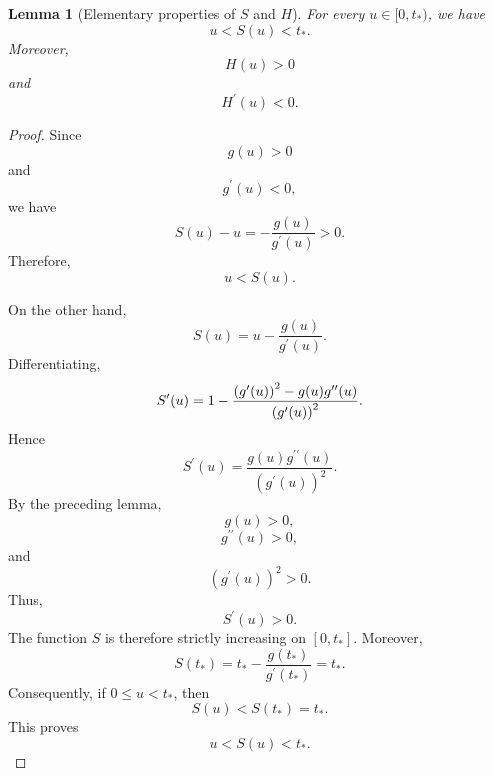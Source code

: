 \documentclass[11pt,a4paper]{article}
\numberwithin{equation}{section}
\numberwithin{table}{section}
\theoremstyle{plain}
\newtheorem{lemma}[theorem]{Lemma}
\theoremstyle{definition}\newtheorem{definition}[theorem]{Definition}
\theoremstyle{remark}\newtheorem{remark}[theorem]{Remark}
\begin{document}
\begin{lemma}[Elementary properties of $S$ and $H$]\label{supp:s2lemma2}
For every $u\in[0,t_*)$, we have 
\begin{equation*}
u<S(u)<t_*.
\end{equation*}
Moreover, 
\begin{equation*}
H(u)>0
\end{equation*}
and 
\begin{equation*}
H^{\prime}(u)<0.
\end{equation*}
\end{lemma}

\begin{proof}
Since 
\begin{equation*}
g(u)>0
\end{equation*}
and 
\begin{equation*}
g^{\prime}(u)<0,
\end{equation*}
we have 
\begin{equation*}
S(u)-u=-\frac{g(u)}{g^{\prime}(u)}>0.
\end{equation*}
Therefore, 
\begin{equation*}
u<S(u).
\end{equation*}

On the other hand, 
\begin{equation*}
S(u)=u-\frac{g(u)}{g^{\prime}(u)}.
\end{equation*}
Differentiating, 
\begin{equation*}
S^{\prime}(u)=1-\frac{\left(g^{\prime}(u)\right)^2-g(u)g^{\prime\prime}(u)}{%
\left(g^{\prime}(u)\right)^2}.
\end{equation*}
Hence 
\begin{equation*}
S^{\prime}(u)=\frac{g(u)g^{\prime\prime}(u)}{\left(g^{\prime}(u)\right)^2}.
\end{equation*}
By the preceding lemma, 
\begin{equation*}
g(u)>0,
\end{equation*}
\begin{equation*}
g^{\prime\prime}(u)>0,
\end{equation*}
and 
\begin{equation*}
\left(g^{\prime}(u)\right)^2>0.
\end{equation*}
Thus, 
\begin{equation*}
S^{\prime}(u)>0.
\end{equation*}
The function $S$ is therefore strictly increasing on $[0,t_*]$.
Moreover, 
\begin{equation*}
S(t_*)=t_*-\frac{g(t_*)}{g^{\prime}(t_*)}=t_*.
\end{equation*}
Consequently, if $0\leq u<t_*$, then 
\begin{equation*}
S(u)<S(t_*)=t_*.
\end{equation*}
This proves 
\begin{equation*}
u<S(u)<t_*.
\end{equation*}


\end{proof}
\end{document}
